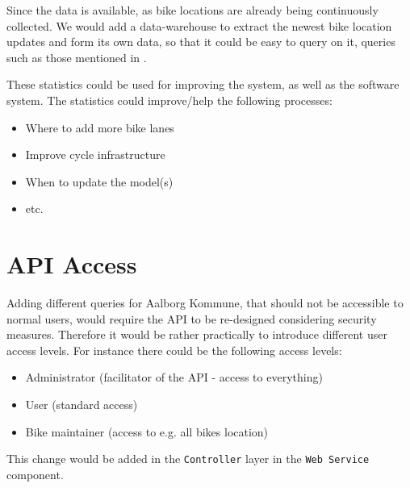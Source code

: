 Since the data is available, as bike locations are already being continuously collected.
We would add a data-warehouse to extract the newest bike location updates and form its own data, so that it could be easy to query on it, queries such as those mentioned in .

These statistics could be used for improving the \citybike system, as well as the software system.
The statistics could improve/help the following processes:
\begin{itemize}
\item Where to add more bike lanes
\item Improve cycle infrastructure
\item When to update the model(s)
\item etc.
\end{itemize}

\section{API Access}
Adding different queries for Aalborg Kommune, that should not be accessible to normal users, would require the API to be re-designed considering security measures.
Therefore it would be rather practically to introduce different user access levels.
For instance there could be the following access levels:
\begin{itemize}
\item Administrator (facilitator of the API - access to everything)
\item User (standard access)
\item Bike maintainer (access to e.g. all bikes location)
\end{itemize}
This change would be added in the \texttt{Controller} layer in the \texttt{Web Service} component.

